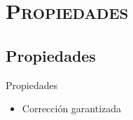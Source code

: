 \documentclass[xcolor=x11names,compress]{beamer}
\renewcommand{\(}{\begin{columns}}
\renewcommand{\)}{\end{columns}}
\newcommand{\<}[1]{\begin{column}{#1}}
\renewcommand{\>}{\end{column}}
\begin{document}
\section{\scshape Propiedades}
\subsection{Propiedades}
\begin{frame}{Propiedades}
    \begin{itemize}
        \item Corrección garantizada
            \begin{block}
                \codeImpossible
            \end{block}
    \end{itemize}
\end{frame}
\end{document}
